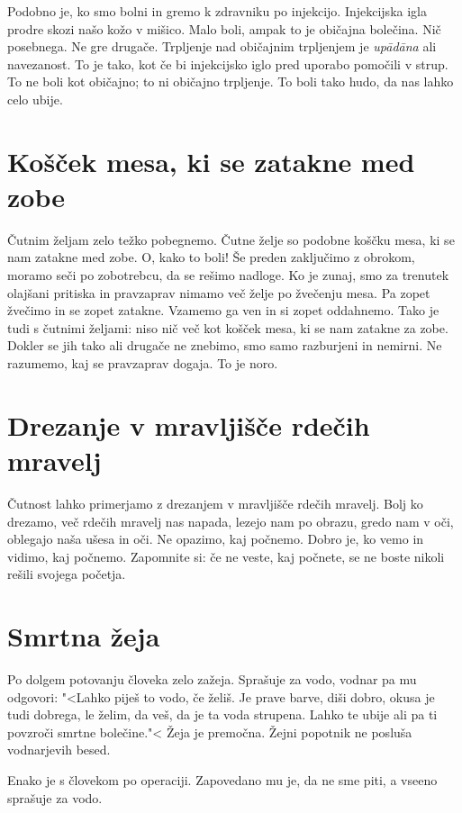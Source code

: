 Podobno je, ko smo bolni in gremo k zdravniku po injekcijo. Injekcijska igla prodre skozi našo kožo v mišico. Malo boli, ampak to je običajna bolečina. Nič posebnega. Ne gre drugače. Trpljenje nad običajnim trpljenjem je \emph{upādāna} ali navezanost. To je tako, kot če bi injekcijsko iglo pred uporabo pomočili v strup. To ne boli kot običajno; to ni običajno trpljenje. To boli tako hudo, da nas lahko celo ubije.

\section{Košček mesa, ki se zatakne med zobe}

Čutnim željam zelo težko pobegnemo. Čutne želje so podobne koščku mesa, ki se nam zatakne med zobe. O, kako to boli! Še preden zaključimo z obrokom, moramo seči po zobotrebcu, da se rešimo nadloge. Ko je zunaj, smo za trenutek olajšani pritiska in pravzaprav nimamo več želje po žvečenju mesa. Pa zopet žvečimo in se zopet zatakne. Vzamemo ga ven in si zopet oddahnemo. Tako je tudi s čutnimi željami: niso nič več kot košček mesa, ki se nam zatakne za zobe. Dokler se jih tako ali drugače ne znebimo, smo samo razburjeni in nemirni. Ne razumemo, kaj se pravzaprav dogaja. To je noro.

\section{Drezanje v mravljišče rdečih mravelj}

Čutnost lahko primerjamo z drezanjem v mravljišče rdečih mravelj. Bolj ko drezamo, več rdečih mravelj nas napada, lezejo nam po obrazu, gredo nam v oči, oblegajo naša ušesa in oči. Ne opazimo, kaj počnemo. Dobro je, ko vemo in vidimo, kaj počnemo. Zapomnite si: če ne veste, kaj počnete, se ne boste nikoli rešili svojega početja.

\section{Smrtna žeja}

Po dolgem potovanju človeka zelo zažeja. Sprašuje za vodo, vodnar pa mu odgovori: "<Lahko piješ to vodo, če želiš. Je prave barve, diši dobro, okusa je tudi dobrega, le želim, da veš, da je ta voda strupena. Lahko te ubije ali pa ti povzroči smrtne bolečine."< Žeja je premočna. Žejni popotnik ne posluša vodnarjevih besed.

Enako je s človekom po operaciji. Zapovedano mu je, da ne sme piti, a vseeno sprašuje za vodo.

